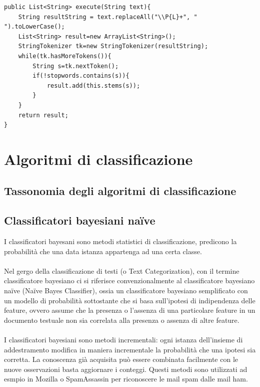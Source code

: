 \documentclass{article}
\theoremstyle{plain}
\theoremstyle{definition}
\begin{document}
\begin{verbatim}
public List<String> execute(String text){
    String resultString = text.replaceAll("\\P{L}+", " ").toLowerCase();
    List<String> result=new ArrayList<String>();
    StringTokenizer tk=new StringTokenizer(resultString);
    while(tk.hasMoreTokens()){
        String s=tk.nextToken(); 
        if(!stopwords.contains(s)){
            result.add(this.stems(s));
        }
    }
    return result;
}
\end{verbatim}


\newpage
\section{Algoritmi di classificazione}
\subsection{Tassonomia degli algoritmi di classificazione}

\subsection{Classificatori bayesiani naïve}
I classificatori bayesani sono metodi statistici di classificazione, predicono la probabilità che una data istanza appartenga ad una certa classe.
\\
\\
Nel gergo della classificazione di testi (o Text Categorization), con il termine classificatore bayesiano ci si riferisce convenzionalmente al classificatore bayesiano naïve (Naïve Bayes Classifier), ossia un classificatore bayesiano semplificato con un modello di probabilità sottostante che si basa sull'ipotesi di indipendenza delle feature, ovvero assume che la presenza o l'assenza di una particolare feature in un documento testuale non sia correlata alla presenza o assenza di altre feature.
\\
\\
I classificatori bayesiani sono metodi incrementali: ogni istanza dell'insieme di addestramento modifica in maniera incrementale la probabilità che una ipotesi sia corretta.
La conoscenza già acquisita può essere combinata facilmente con le nuove osservazioni basta aggiornare i conteggi. Questi metodi sono utilizzati ad esmpio in Mozilla o SpamAssassin per riconoscere le mail spam dalle mail ham.
\end{document}
